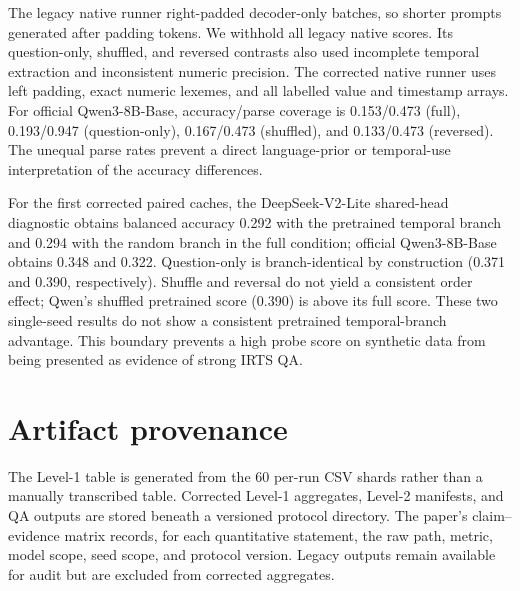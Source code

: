 \documentclass{article}
\begin{document}
The legacy native runner right-padded decoder-only batches, so shorter prompts
generated after padding tokens.  We withhold all legacy native scores.  Its
question-only, shuffled, and reversed contrasts also used incomplete temporal
extraction and inconsistent numeric precision.  The corrected native runner
uses left padding, exact numeric lexemes, and all labelled value and timestamp
arrays.  For official Qwen3-8B-Base, accuracy/parse coverage is 0.153/0.473
(full), 0.193/0.947 (question-only), 0.167/0.473 (shuffled), and 0.133/0.473
(reversed).  The unequal parse rates prevent a direct language-prior or
temporal-use interpretation of the accuracy differences.

For the first corrected paired caches, the DeepSeek-V2-Lite shared-head
diagnostic obtains balanced accuracy 0.292 with the pretrained temporal branch
and 0.294 with the random branch in the full condition; official Qwen3-8B-Base
obtains 0.348 and 0.322.  Question-only is branch-identical by construction
(0.371 and 0.390, respectively).  Shuffle and reversal do not yield a
consistent order effect; Qwen's shuffled pretrained score (0.390) is above its
full score.  These two single-seed results do not show a consistent pretrained
temporal-branch advantage.  This boundary prevents a high probe score on
synthetic data from being presented as evidence of strong IRTS QA.

\section{Artifact provenance}

The Level-1 table is generated from the 60 per-run CSV shards rather than a
manually transcribed table.  Corrected Level-1 aggregates, Level-2 manifests,
and QA outputs are stored beneath a versioned protocol directory.  The paper's
claim--evidence matrix records, for each quantitative statement, the raw path,
metric, model scope, seed scope, and protocol version.  Legacy outputs remain
available for audit but are excluded from corrected aggregates.
\end{document}
